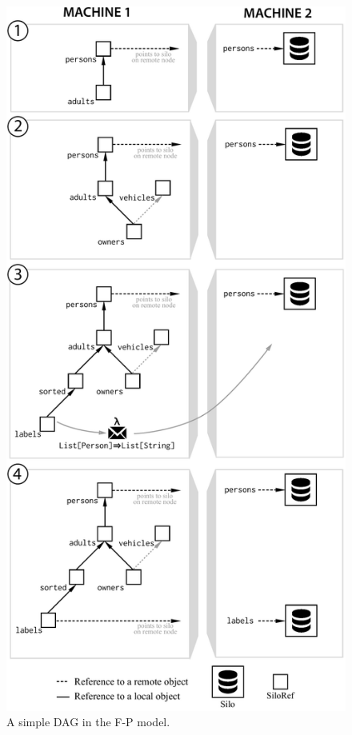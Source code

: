 \documentclass[preprint]{sigplanconf}
\theoremstyle{definition}
\theoremstyle{definition}
\begin{document}
\begin{figure}[t!]
\centering\includegraphics[width=\columnwidth]{bigger-dag.pdf}
\caption{A simple DAG in the F-P model.}\label{fig:bigger-dag}
\end{figure}
\end{document}
